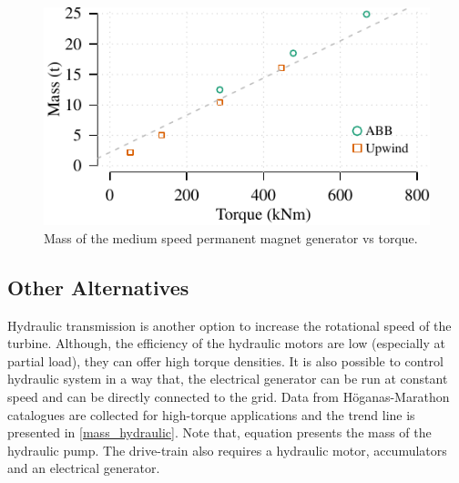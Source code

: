 \documentclass{article}\usepackage{graphicx, color}
\makeatletter
\def\maxwidth{ %
  \ifdim\Gin@nat@width>\linewidth
    \linewidth
  \else
    \Gin@nat@width
  \fi
}
\newenvironment{knitrout}{}{} %
\makeatother
\begin{document}
\begin{knitrout}
\color{fgcolor}\begin{figure}[]


{\centering \includegraphics[width=\maxwidth]{figure/plot1gpm} 

}

\caption[Mass of the medium speed permanent magnet generator vs torque]{Mass of the medium speed permanent magnet generator vs torque.\label{fig:plot1gpm}}
\end{figure}


\end{knitrout}




\subsection{Other Alternatives}

Hydraulic transmission is another option to increase the rotational speed of the turbine. Although, the efficiency of the hydraulic motors are low (especially at partial load), they can offer high torque densities. It is also possible to control hydraulic system in a way that, the electrical generator can be run at constant speed and can be directly connected to the grid. Data from H\"{o}ganas-Marathon catalogues are collected for high-torque applications \cite{Hagglunds2012} and the trend line is presented in \autoref{mass_hydraulic}. Note that, equation presents the mass of the hydraulic pump. The drive-train also requires a hydraulic motor, accumulators and an electrical generator.
\end{document}
